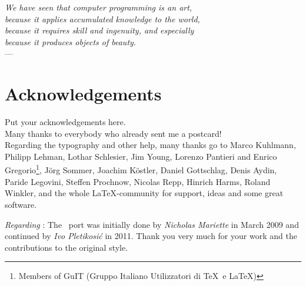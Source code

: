 

\begin{flushright}{\slshape    
We have seen that computer programming is an art, \\ 
because it applies accumulated knowledge to the world, \\ 
because it requires skill and ingenuity, and especially \\
because it produces objects of beauty.} \\ \medskip
---  \citep{knuth:1974}
\end{flushright}

\bigskip


\begingroup

\let\clearpage\relax
\let\cleardoublepage\relax
\let\cleardoublepage\relax

\chapter*{Acknowledgements}

\noindent Put your acknowledgements here.\\

\noindent Many thanks to everybody who already sent me a postcard!\\

\noindent Regarding the typography and other help, many thanks go to Marco Kuhlmann, Philipp Lehman, Lothar Schlesier, Jim Young, Lorenzo Pantieri and Enrico Gregorio\footnote{Members of GuIT (Gruppo Italiano Utilizzatori di \TeX\ e \LaTeX )}, J\"org Sommer, Joachim K\"ostler, Daniel Gottschlag, Denis Aydin, Paride Legovini, Steffen Prochnow, Nicolas Repp, Hinrich Harms, Roland Winkler, and the whole \LaTeX-community for support, ideas and some great software.

\bigskip

\noindent\emph{Regarding \mLyX}: The \mLyX\ port was initially done by
\emph{Nicholas Mariette} in March 2009 and continued by
\emph{Ivo Pletikosi\'c} in 2011. Thank you very much for your work and the contributions to the original style.

\endgroup